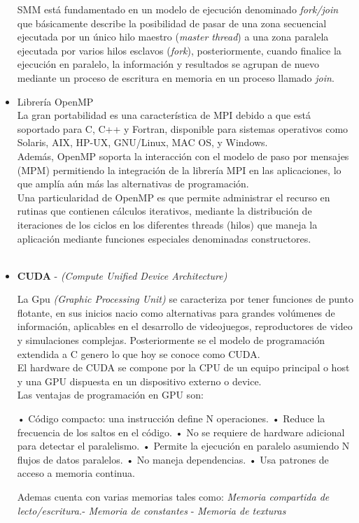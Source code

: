 \begin{itemize}
SMM está fundamentado en un modelo de ejecución denominado \textit{fork/join} que básicamente describe la posibilidad de pasar de una zona secuencial ejecutada por un único hilo maestro (\textit{master thread}) a una zona paralela ejecutada por varios hilos esclavos (\textit{fork}), posteriormente, cuando finalice la ejecución en paralelo, la información y resultados se agrupan de nuevo mediante un proceso de escritura en memoria en un proceso llamado \textit{join}.\\

	\item Librería OpenMP
	\\
La gran portabilidad es una característica de MPI debido a que está soportado para C, C++ y Fortran, disponible para sistemas operativos como Solaris, AIX, HP-UX, GNU/Linux, MAC OS, y Windows.\\
Además, OpenMP soporta la interacción con el modelo de paso por mensajes (MPM) permitiendo la integración de la librería MPI en las aplicaciones, lo que amplía aún más las alternativas de programación.\\
Una particularidad de OpenMP es que permite administrar el recurso en rutinas que contienen cálculos iterativos, mediante la distribución de iteraciones de los ciclos en los diferentes threads (hilos) que maneja la aplicación mediante funciones especiales denominadas constructores.
\\\\	
	
	\item \textbf{CUDA} - \textit{(Compute Unified Device Architecture)}
	
	La Gpu \textit{(Graphic Processing Unit)} se caracteriza por tener funciones de punto flotante, en sus inicios nacio como alternativas para grandes volúmenes de información, aplicables en el desarrollo de videojuegos, reproductores de video y simulaciones complejas. Posteriormente se el modelo de programación extendida a C genero lo que hoy se conoce como CUDA.\\
El hardware de CUDA se compone por la CPU de un equipo principal o host y una GPU dispuesta en un dispositivo externo o device.\\

Las ventajas de programación en GPU son:


\subitem • Código compacto: una instrucción define N operaciones.
\subitem •  Reduce la frecuencia de los saltos en el código.
\subitem • No se requiere de hardware adicional para detectar el paralelismo.
\subitem • Permite la ejecución en paralelo asumiendo N flujos de datos paralelos.
\subitem • No maneja dependencias.
\subitem • Usa patrones de acceso a memoria continua.
		
Ademas cuenta con varias memorias tales como: \textit{Memoria compartida de lecto/escritura.}- \textit{Memoria de constantes} - \textit{Memoria de texturas}   		
	
\end{itemize}   

